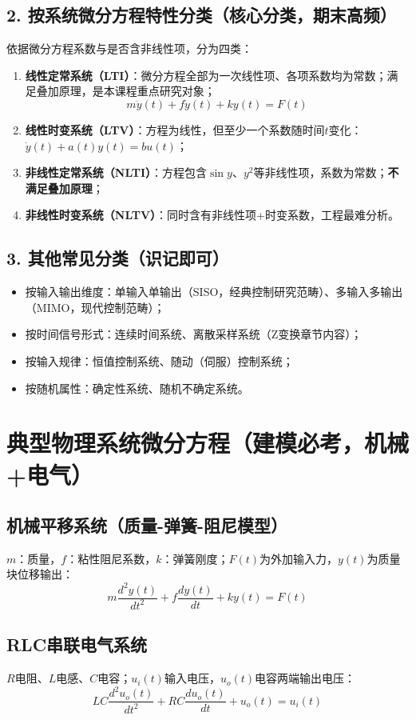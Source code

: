 \subsection{2. 按系统微分方程特性分类（核心分类，期末高频）}
依据微分方程系数与是否含非线性项，分为四类：
\begin{enumerate}
    \item \textbf{线性定常系统（LTI）}：微分方程全部为一次线性项、各项系数均为常数；满足叠加原理，是本课程重点研究对象；
    \[
    m\ddot{y}(t)+f\dot{y}(t)+ky(t)=F(t)
    \]
    \item \textbf{线性时变系统（LTV）}：方程为线性，但至少一个系数随时间$t$变化：$\dot{y}(t)+a(t)y(t)=bu(t)$；
    \item \textbf{非线性定常系统（NLTI）}：方程包含$\sin y$、$y^2$等非线性项，系数为常数；\textbf{不满足叠加原理}；
    \item \textbf{非线性时变系统（NLTV）}：同时含有非线性项+时变系数，工程最难分析。
\end{enumerate}

\subsection{3. 其他常见分类（识记即可）}
\begin{itemize}
    \item 按输入输出维度：单输入单输出（SISO，经典控制研究范畴）、多输入多输出（MIMO，现代控制范畴）；
    \item 按时间信号形式：连续时间系统、离散采样系统（Z变换章节内容）；
    \item 按输入规律：恒值控制系统、随动（伺服）控制系统；
    \item 按随机属性：确定性系统、随机不确定系统。
\end{itemize}

\section{典型物理系统微分方程（建模必考，机械+电气）}
\subsection{机械平移系统（质量-弹簧-阻尼模型）}
$m$：质量，$f$：粘性阻尼系数，$k$：弹簧刚度；$F(t)$为外加输入力，$y(t)$为质量块位移输出：
\[
m \frac{d^2 y(t)}{dt^2} + f \frac{d y(t)}{dt} + k y(t) = F(t)
\]

\subsection{RLC串联电气系统}
$R$电阻、$L$电感、$C$电容；$u_i(t)$输入电压，$u_o(t)$电容两端输出电压：
\[
LC \frac{d^2 u_o(t)}{dt^2} + RC \frac{du_o(t)}{dt} + u_o(t) = u_i(t)
\]

